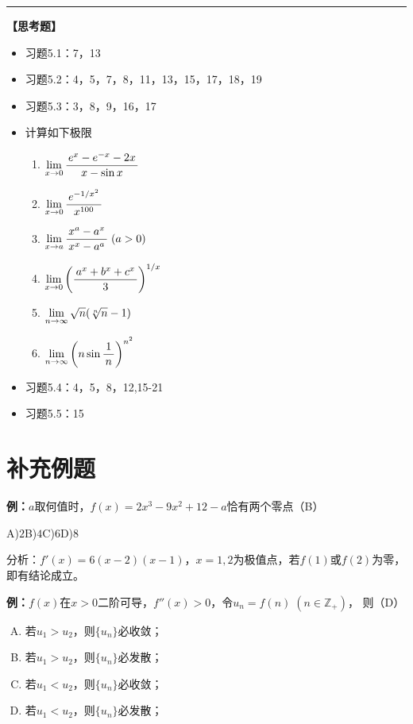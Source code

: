 \bigskip

\hrule

\bigskip
\bigskip

{\bf 【思考题】}

\begin{itemize}
  \item 习题5.1：7，13
  \item 习题5.2：4，5，7，8，11，13，15，17，18，19
  \item 习题5.3：3，8，9，16，17
  \item 计算如下极限
  	\begin{enumerate}
	  \item $\lim\limits_{x\to{0}}\displaystyle\frac{\,{e^x-e^{-x}-2x}\,}{\,{x-\sin x}\,}$ 
	  \item $\lim\limits_{x\to{0}}\displaystyle\frac{\,{e^{-1/x^2}}\,}{\,{x^{100}}\,}$ 
	  \item $\lim\limits_{x\to{a}}\displaystyle\frac{\,{x^a-a^x}\,}{\,{x^x-a^a}\,}\;(a>0)$ 
	  \item $\lim\limits_{x\to{0}}\left(\displaystyle\frac{\,{a^x+b^x+c^x}\,}{\,{3}\,}\right)^{1/x}$ 
	  \item $\lim\limits_{n\to\infty}\sqrt{n}(\sqrt[n]{n}-1)$ 
	  \item $\lim\limits_{n\to\infty}\left(n\sin\displaystyle\frac{\,{1}\,}{\,{n}\,}\right)^{n^2}$
	\end{enumerate}	
  \item 习题5.4：4，5，8，12,15-21
  \item 习题5.5：15
\end{itemize}

\newpage

\section*{补充例题}

{\bf 例：}$a$取何值时，$f(x)=2x^3-9x^2+12-a$恰有两个零点（B）

A)$2$\quad B)$4$\quad C)$6$\quad D)$8$

分析：$f'(x)=6(x-2)(x-1)$，$x=1,2$为极值点，若$f(1)$或$f(2)$为零，即有结论成立。

{\bf 例：}$f(x)$在$x>0$二阶可导，$f''(x)>0$，令$u_n=f(n)\;(n\in\mathbb{Z}_+)$，
则（D）
\begin{enumerate}[A)]
  \setlength{\itemindent}{1cm}
  \item 若$u_1>u_2$，则$\{u_n\}$必收敛；
  \item 若$u_1>u_2$，则$\{u_n\}$必发散；
  \item 若$u_1<u_2$，则$\{u_n\}$必收敛；
  \item 若$u_1<u_2$，则$\{u_n\}$必发散；
\end{enumerate}


